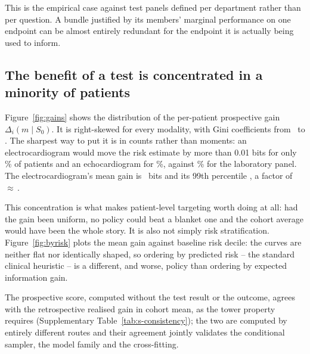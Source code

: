 \documentclass[11pt]{article}
\theoremstyle{definition}
\theoremstyle{remark}
\begin{document}
This is the empirical case against test panels defined per department rather
than per question. A bundle justified by its members' marginal performance on
one endpoint can be almost entirely redundant for the endpoint it is actually
being used to inform.

\subsection{The benefit of a test is concentrated in a minority of patients}

Figure~\ref{fig:gains} shows the distribution of the per-patient prospective
gain $\Delta_i(m\mid S_0)$. It is right-skewed for every modality, with Gini
coefficients from \gainMinGini\ to \gainMaxGini. The sharpest way to put it is in
counts rather than moments: an electrocardiogram would move the risk estimate by
more than 0.01 bits for only \gainEcgFracAbove\% of patients and an
echocardiogram for \gainEchoFracAbove\%, against \gainLabsFracAbove\% for the
laboratory panel. The electrocardiogram's mean gain is \gainEcgMean\ bits and its
99th percentile \gainEcgPNinetynine, a factor of
$\approx$\,\gainEcgConcentration.

This concentration is what makes patient-level targeting worth doing at all: had
the gain been uniform, no policy could beat a blanket one and the cohort average
would have been the whole story. It is also not simply risk stratification.
Figure~\ref{fig:byrisk} plots the mean gain against baseline risk decile: the
curves are neither flat nor identically shaped, so ordering by predicted risk --
the standard clinical heuristic -- is a different, and worse, policy than
ordering by expected information gain.

The prospective score, computed without the test result or the outcome, agrees
with the retrospective realised gain in cohort mean, as the tower property
requires (Supplementary Table~\ref{tab:s-consistency}); the two are computed by entirely different
routes and their agreement jointly validates the conditional sampler, the model
family and the cross-fitting.
\end{document}
